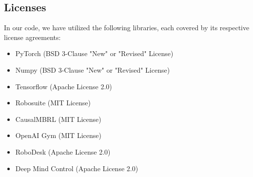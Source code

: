\subsection{Licenses}
In our code, we have utilized the following libraries, each covered by its respective license agreements:
\begin{itemize}
    \item PyTorch (BSD 3-Clause "New" or "Revised" License)
    \item Numpy (BSD 3-Clause "New" or "Revised" License)
    \item Tensorflow (Apache License 2.0)
    \item Robosuite (MIT License)
    \item CausalMBRL (MIT License)
    \item OpenAI Gym (MIT License)
    \item RoboDesk (Apache License 2.0)
    \item Deep Mind Control (Apache License 2.0)
\end{itemize}

\maketitle

% 
% 

